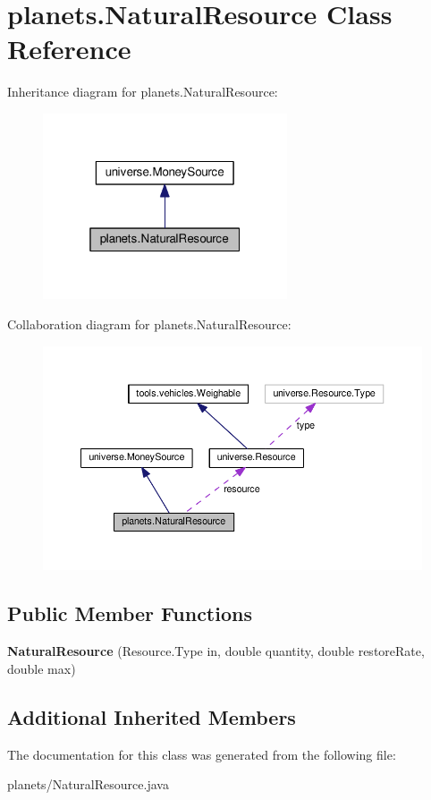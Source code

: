 \hypertarget{classplanets_1_1_natural_resource}{}\section{planets.\+Natural\+Resource Class Reference}
\label{classplanets_1_1_natural_resource}


Inheritance diagram for planets.\+Natural\+Resource\+:\nopagebreak
\begin{figure}[H]
\begin{center}
\leavevmode
\includegraphics[width=205pt]{classplanets_1_1_natural_resource__inherit__graph}
\end{center}
\end{figure}


Collaboration diagram for planets.\+Natural\+Resource\+:
\nopagebreak
\begin{figure}[H]
\begin{center}
\leavevmode
\includegraphics[width=350pt]{classplanets_1_1_natural_resource__coll__graph}
\end{center}
\end{figure}
\subsection*{Public Member Functions}
\begin{DoxyCompactItemize}
\item 
{\bfseries Natural\+Resource} (Resource.\+Type in, double quantity, double restore\+Rate, double max)\hypertarget{classplanets_1_1_natural_resource_a3f355c0819343848fac8e1abd6da00a2}{}\label{classplanets_1_1_natural_resource_a3f355c0819343848fac8e1abd6da00a2}

\end{DoxyCompactItemize}
\subsection*{Additional Inherited Members}


The documentation for this class was generated from the following file\+:\begin{DoxyCompactItemize}
\item 
planets/Natural\+Resource.\+java\end{DoxyCompactItemize}
